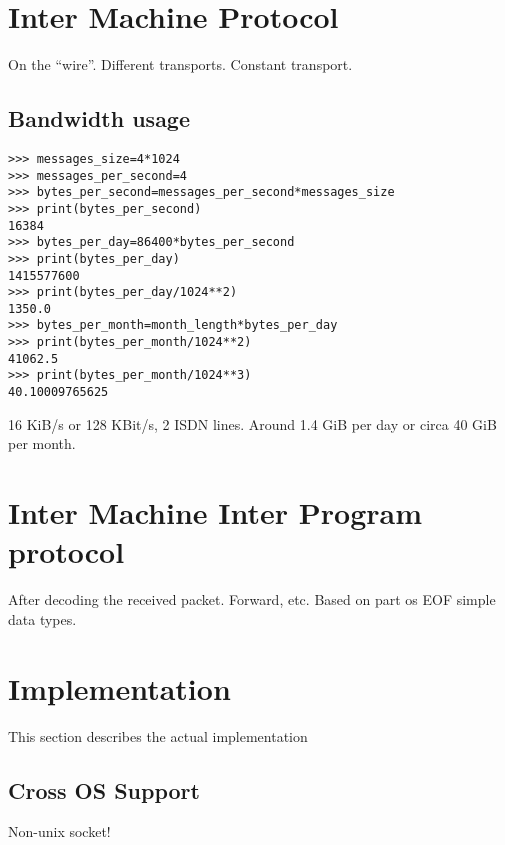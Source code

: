 \documentclass[12pt,a4paper]{article}
\begin{document}
\section{Inter Machine Protocol}
On the "`wire"'. Different transports. Constant transport.

\subsection{Bandwidth usage}
\begin{verbatim}
>>> messages_size=4*1024
>>> messages_per_second=4
>>> bytes_per_second=messages_per_second*messages_size
>>> print(bytes_per_second)
16384
>>> bytes_per_day=86400*bytes_per_second
>>> print(bytes_per_day)
1415577600
>>> print(bytes_per_day/1024**2)
1350.0
>>> bytes_per_month=month_length*bytes_per_day
>>> print(bytes_per_month/1024**2)
41062.5
>>> print(bytes_per_month/1024**3)
40.10009765625
\end{verbatim}
16 KiB/s or 128 KBit/s, 2 ISDN lines. Around 1.4 GiB per day or
circa 40 GiB per month.

\section{Inter Machine Inter Program protocol}
After decoding the received packet. Forward, etc.
Based on part os EOF simple data types.

\section{Implementation}
This section describes the actual implementation
\subsection{Cross OS Support}
Non-unix socket!



\end{document}
